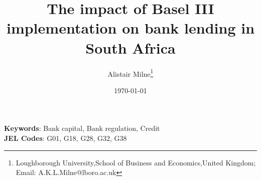 
\title{The impact of Basel III implementation on bank lending in South Africa}


\author{ 
Alistair Milne\footnote{Loughborough University,School of Business and Economics,United Kingdom; Email: A.K.L.Milne@lboro.ac.uk} 
}
\date{\today}
\maketitle

\begin{abstract}

\end{abstract}

\noindent\textbf{Keywords}: Bank capital, Bank regulation, Credit   \\
\textbf{JEL Codes}: G01, G18, G28, G32, G38
\newpage